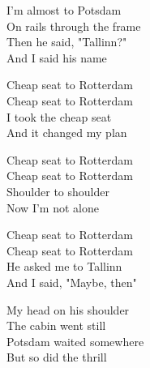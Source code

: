 \begin{lyrics}
I'm almost to Potsdam\\
On rails through the frame\\
Then he said, "Tallinn?"\\
And I said his name

Cheap seat to Rotterdam\\
Cheap seat to Rotterdam\\
I took the cheap seat\\
And it changed my plan

Cheap seat to Rotterdam\\
Cheap seat to Rotterdam\\
Shoulder to shoulder\\
Now I'm not alone

Cheap seat to Rotterdam\\
Cheap seat to Rotterdam\\
He asked me to Tallinn\\
And I said, "Maybe, then"

My head on his shoulder\\
The cabin went still\\
Potsdam waited somewhere\\
But so did the thrill

\end{lyrics}


